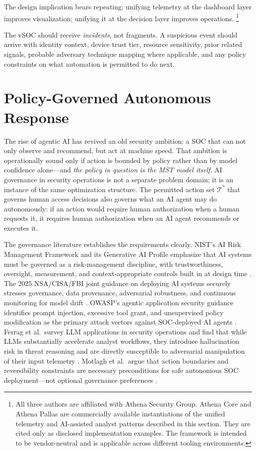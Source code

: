 \documentclass[acmlarge]{acmart}
\begin{document}
The design implication bears repeating: unifying telemetry at the dashboard layer
improves visualization; unifying it at the decision layer improves operations.%
\footnote{All three authors are affiliated with Athena Security Group. Athena Core
\cite{athenacore2026} and Athena Pallas \cite{athenapallas2026} are commercially
available instantiations of the unified telemetry and AI-assisted analyst patterns
described in this section. They are cited only as disclosed implementation examples.
The framework is intended to be vendor-neutral and is applicable across different
tooling environments.}

The vSOC should receive \textit{incidents}, not fragments. A suspicious event should
arrive with identity context, device trust tier, resource sensitivity, prior related
signals, probable adversary technique mapping where applicable, and any policy constraints
on what automation is permitted to do next.

\section{Policy-Governed Autonomous Response}
\label{sec:autonomy}

The rise of agentic AI has revived an old security ambition: a SOC that can not only
observe and recommend, but act at machine speed. That ambition is operationally sound
only if action is bounded by policy rather than by model confidence alone---and
\textit{the policy in question is the MST model itself}. AI governance in security
operations is not a separate problem domain; it is an instance of the same
optimization structure. The permitted action set $\mathcal{T}^{*}$ that governs
human access decisions also governs what an AI agent may do autonomously: if an
action would require human authorization when a human requests it, it requires human
authorization when an AI agent recommends or executes it.

The governance literature establishes the requirements clearly. NIST's AI Risk
Management Framework and its Generative AI Profile emphasize that AI systems must
be governed as a risk-management discipline, with trustworthiness, oversight,
measurement, and context-appropriate controls built in at design time
\cite{tabassi2023,autio2024}. The 2025 NSA/CISA/FBI joint guidance on deploying
AI systems securely stresses governance, data provenance, adversarial robustness,
and continuous monitoring for model drift \cite{nsa2024,aidatasec2025}. OWASP's
agentic application security guidance identifies prompt injection, excessive tool
grant, and unsupervised policy modification as the primary attack vectors against
SOC-deployed AI agents \cite{owasp2025}. Ferrag et al.\ survey LLM applications in
security operations and find that while LLMs substantially accelerate analyst
workflows, they introduce hallucination risk in threat reasoning and are directly
susceptible to adversarial manipulation of their input telemetry \cite{ferrag2025}.
Motlagh et al.\ argue that action boundaries and reversibility constraints are
necessary preconditions for safe autonomous SOC deployment---not optional governance
preferences \cite{motlagh2024}.
\end{document}
